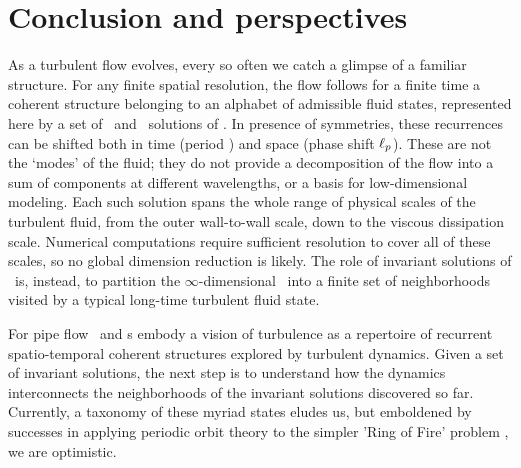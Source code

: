 
\section{Conclusion and perspectives}
\label{s:concl}


As a turbulent flow evolves, every so often we catch a glimpse of a
familiar structure. For any finite spatial resolution, the flow
follows for a finite time a coherent structure belonging to an
alphabet of admissible fluid states, represented here by a set of \reqv\
and \rpo\ solutions of \NS.
In presence of symmetries, these recurrences can be shifted both in time
(period \period{p}) and space (phase shift $\ell_p$).
These are not the `modes' of the fluid; {they
do not provide a decomposition of the flow into a sum of components at
different wavelengths, or a basis for low-dimensional
modeling.} Each such solution spans the whole range of physical scales of
the turbulent fluid, from the outer wall-to-wall scale, down to the
viscous dissipation scale. Numerical computations require sufficient
resolution to cover all of these scales, so no {global} dimension
reduction is likely. The role of invariant solutions of \NS\ is, instead,
to partition the $\infty$-dimensional \statesp\ into a finite set of
neighborhoods visited by a typical long-time turbulent fluid state.

For pipe flow \reqva\ and \rpo s embody a vision of turbulence as a
repertoire of recurrent spatio-temporal coherent structures explored by
turbulent dynamics. Given a set of invariant solutions, the next
step is to understand how the dynamics interconnects the neighborhoods of
the invariant solutions discovered so far.
Currently, a taxonomy of these myriad states eludes us, but emboldened by
successes in applying periodic orbit theory to the simpler 'Ring of Fire' problem
\rf{Christiansen97,lanCvit07,SCD07}, we are optimistic.



